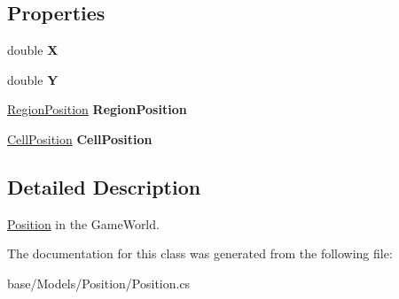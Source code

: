 \subsection*{Properties}
\begin{DoxyCompactItemize}
\item 
\hypertarget{classCore_1_1Models_1_1Position_a60f236378b77fb83a9b51d92c5d4359f}{double {\bfseries X}}\label{classCore_1_1Models_1_1Position_a60f236378b77fb83a9b51d92c5d4359f}

\item 
\hypertarget{classCore_1_1Models_1_1Position_a795b40cbfc260e222c319cd50b5ab78c}{double {\bfseries Y}}\label{classCore_1_1Models_1_1Position_a795b40cbfc260e222c319cd50b5ab78c}

\item 
\hypertarget{classCore_1_1Models_1_1Position_a7b92c9b041328e5f660f1a9f137249c6}{\hyperlink{classCore_1_1Models_1_1RegionPosition}{Region\-Position} {\bfseries Region\-Position}}\label{classCore_1_1Models_1_1Position_a7b92c9b041328e5f660f1a9f137249c6}

\item 
\hypertarget{classCore_1_1Models_1_1Position_afee231a72dbd2f57329e2bdd2fbc25bb}{\hyperlink{classCore_1_1Models_1_1CellPosition}{Cell\-Position} {\bfseries Cell\-Position}}\label{classCore_1_1Models_1_1Position_afee231a72dbd2f57329e2bdd2fbc25bb}

\end{DoxyCompactItemize}


\subsection{Detailed Description}
\hyperlink{classCore_1_1Models_1_1Position}{Position} in the Game\-World. 



The documentation for this class was generated from the following file\-:\begin{DoxyCompactItemize}
\item 
base/\-Models/\-Position/Position.\-cs\end{DoxyCompactItemize}
